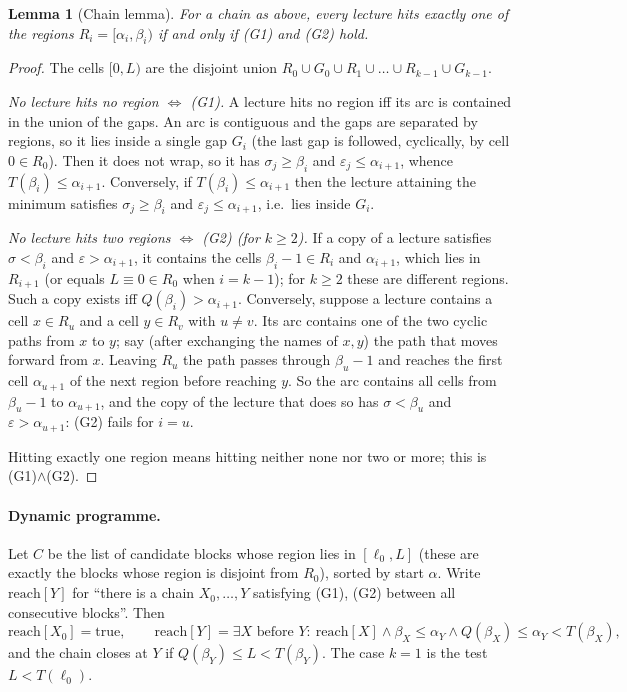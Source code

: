 \documentclass[11pt,a4paper]{article}
\newtheorem{lemma}{Lemma}
\theoremstyle{definition}
\theoremstyle{remark}
\newcommand{\Qf}{Q}
\newcommand{\Tf}{T}
\begin{document}
\begin{lemma}[Chain lemma]\label{lem:chain}
For a chain as above, every lecture hits exactly one of the regions
$R_i=[\alpha_i,\beta_i)$ if and only if (G1) and (G2) hold.
\end{lemma}
\begin{proof}
The cells $[0,L)$ are the disjoint union $R_0\cup G_0\cup R_1\cup\dots\cup R_{k-1}\cup G_{k-1}$.

\emph{No lecture hits no region $\iff$ (G1).}  A lecture hits no region iff its arc is
contained in the union of the gaps.  An arc is contiguous and the gaps are separated by
regions, so it lies inside a single gap $G_i$ (the last gap is followed, cyclically, by
cell $0\in R_0$).  Then it does not wrap, so it has $\sigma_j\ge\beta_i$ and
$\varepsilon_j\le\alpha_{i+1}$, whence $\Tf(\beta_i)\le\alpha_{i+1}$.  Conversely, if
$\Tf(\beta_i)\le\alpha_{i+1}$ then the lecture attaining the minimum satisfies
$\sigma_j\ge\beta_i$ and $\varepsilon_j\le\alpha_{i+1}$, i.e.\ lies inside $G_i$.

\emph{No lecture hits two regions $\iff$ (G2) (for $k\ge2$).}  If a copy of a lecture
satisfies $\sigma<\beta_i$ and $\varepsilon>\alpha_{i+1}$, it contains the cells
$\beta_i-1\in R_i$ and $\alpha_{i+1}$, which lies in $R_{i+1}$ (or equals $L\equiv0\in R_0$
when $i=k-1$); for $k\ge2$ these are different regions.  Such a copy exists iff
$\Qf(\beta_i)>\alpha_{i+1}$.  Conversely, suppose a lecture contains a cell $x\in R_u$
and a cell $y\in R_v$ with $u\ne v$.  Its arc contains one of the two cyclic paths from
$x$ to $y$; say (after exchanging the names of $x,y$) the path that moves forward from
$x$.  Leaving $R_u$ the path passes through $\beta_u-1$ and reaches the first cell
$\alpha_{u+1}$ of the next region before reaching $y$.  So the arc contains all cells from
$\beta_u-1$ to $\alpha_{u+1}$, and the copy of the lecture that does so has
$\sigma<\beta_u$ and $\varepsilon>\alpha_{u+1}$: (G2) fails for $i=u$.

Hitting exactly one region means hitting neither none nor two or more; this is
(G1)$\wedge$(G2).
\end{proof}

\paragraph{Dynamic programme.} Let $C$ be the list of candidate blocks whose region lies
in $[\ell_0,L]$ (these are exactly the blocks whose region is disjoint from $R_0$),
sorted by start $\alpha$.  Write $\mathrm{reach}[Y]$ for ``there is a chain $X_0,\dots,Y$
satisfying (G1), (G2) between all consecutive blocks''.  Then
\[
 \mathrm{reach}[X_0]=\text{true},\qquad
 \mathrm{reach}[Y]=\exists X\text{ before }Y:\ \mathrm{reach}[X]\wedge\beta_X\le\alpha_Y\wedge
 \Qf(\beta_X)\le\alpha_Y<\Tf(\beta_X),
\]
and the chain closes at $Y$ if $\Qf(\beta_Y)\le L<\Tf(\beta_Y)$.  The case $k=1$ is
the test $L<\Tf(\ell_0)$.
\end{document}
